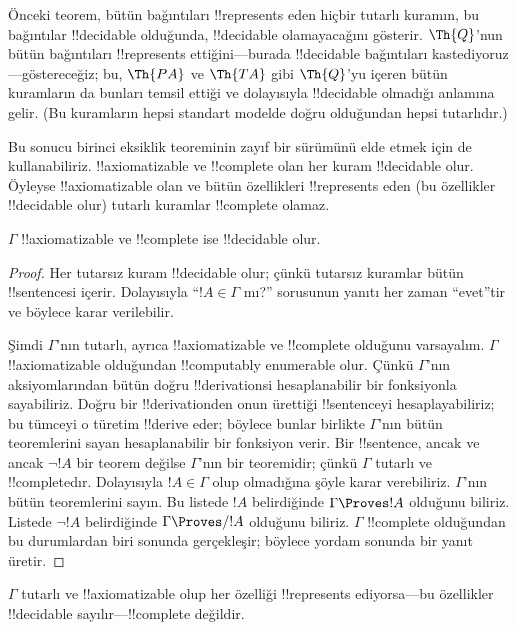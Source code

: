 \documentclass[../../../include/open-logic-section]{subfiles}
\begin{document}
\begin{explain}
Önceki teorem, bütün bağıntıları !!{represents} eden hiçbir tutarlı kuramın,
bu bağıntılar !!{decidable} olduğunda, !!{decidable} olamayacağını gösterir.
$\Th{Q}$'nun bütün bağıntıları !!{represents} ettiğini---burada
!!{decidable} bağıntıları kastediyoruz---göstereceğiz; bu,
$\Th{PA}$ ve $\Th{TA}$ gibi $\Th{Q}$'yu içeren bütün kuramların da bunları
temsil ettiği ve dolayısıyla !!{decidable} olmadığı anlamına gelir.
(Bu kuramların hepsi standart modelde doğru olduğundan hepsi tutarlıdır.)

Bu sonucu birinci eksiklik teoreminin zayıf bir sürümünü elde etmek için de
kullanabiliriz. !!{axiomatizable} ve !!{complete} olan her kuram
!!{decidable} olur. Öyleyse !!{axiomatizable} olan ve bütün özellikleri
!!{represents} eden (bu özellikler !!{decidable} olur) tutarlı kuramlar
!!{complete} olamaz.
\end{explain}

\begin{thm}
$\Gamma$ !!{axiomatizable} ve !!{complete} ise !!{decidable} olur.
\end{thm}

\begin{proof}
Her tutarsız kuram !!{decidable} olur; çünkü tutarsız kuramlar bütün
!!{sentence}s{}i içerir. Dolayısıyla ``$!A \in \Gamma$ mı?'' sorusunun
yanıtı her zaman ``evet''tir ve böylece karar verilebilir.

Şimdi $\Gamma$'nın tutarlı, ayrıca !!{axiomatizable} ve !!{complete}
olduğunu varsayalım. $\Gamma$ !!{axiomatizable} olduğundan
!!{computably enumerable} olur. Çünkü $\Gamma$'nın aksiyomlarından bütün
doğru !!{derivation}s{}i hesaplanabilir bir fonksiyonla sayabiliriz. Doğru
bir !!{derivation}{}den onun ürettiği !!{sentence}{}yi hesaplayabiliriz; bu
tümceyi o türetim !!{derive} eder;
böylece bunlar birlikte $\Gamma$'nın bütün teoremlerini sayan hesaplanabilir
bir fonksiyon verir. Bir !!{sentence}, ancak ve ancak $\lnot !A$ bir teorem
değilse $\Gamma$'nın bir teoremidir; çünkü $\Gamma$ tutarlı ve
!!{complete}{}dır. Dolayısıyla $!A \in \Gamma$ olup olmadığına şöyle karar
verebiliriz. $\Gamma$'nın bütün teoremlerini sayın. Bu listede $!A$
belirdiğinde $\Gamma \Proves !A$ olduğunu biliriz. Listede $\lnot !A$
belirdiğinde $\Gamma \Proves/ !A$ olduğunu biliriz. $\Gamma$ !!{complete}
olduğundan bu durumlardan biri sonunda gerçekleşir; böylece yordam sonunda
bir yanıt üretir.
\end{proof}

\begin{cor}
$\Gamma$ tutarlı ve !!{axiomatizable} olup her özelliği !!{represents}
ediyorsa---bu özellikler !!{decidable} sayılır---!!{complete} değildir.
\end{cor}
\end{document}
